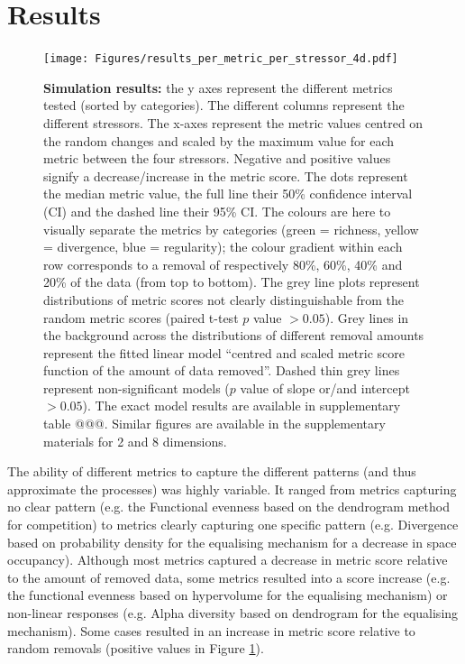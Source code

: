 \documentclass[12pt,letterpaper]{article}
\begin{document}
\section{Results}


\begin{figure}[!htbp]
\centering
   \texttt{[image: Figures/results\_per\_metric\_per\_stressor\_4d.pdf]}
\caption{\scriptsize{\textbf{Simulation results:} the y axes represent the different metrics tested (sorted by categories).
The different columns represent the different stressors. The x-axes represent the metric values centred on the random changes and scaled by the maximum value for each metric between the four stressors.
Negative and positive values signify a decrease/increase in the metric score.
The dots represent the median metric value, the full line their 50\% confidence interval (CI) and the dashed line their 95\% CI.
The colours are here to visually separate the metrics by categories (green = richness, yellow = divergence, blue = regularity); the colour gradient within each row corresponds to a removal of respectively 80\%, 60\%, 40\% and 20\% of the data (from top to bottom).
The grey line plots represent distributions of metric scores not clearly distinguishable from the random metric scores (paired t-test $p$ value $> 0.05$).
Grey lines in the background across the distributions of different removal amounts represent the fitted linear model ``centred and scaled metric score function of the amount of data removed''.
Dashed thin grey lines represent non-significant models ($p$ value of slope or/and intercept $> 0.05$).
The exact model results are available in supplementary table @@@.
Similar figures are available in the supplementary materials for 2 and 8 dimensions.}}
\label{Fig:simulation_results}
\end{figure}
\bigskip

The ability of different metrics to capture the different patterns (and thus approximate the processes) was highly variable.
It ranged from metrics capturing no clear pattern (e.g. the Functional evenness based on the dendrogram method for competition) to metrics clearly capturing one specific pattern (e.g. Divergence based on probability density for the equalising mechanism for a decrease in space occupancy).
Although most metrics captured a decrease in metric score relative to the amount of removed data, some metrics resulted into a score increase (e.g. the functional evenness based on hypervolume for the equalising mechanism) or non-linear responses (e.g. Alpha diversity based on dendrogram for the equalising mechanism).
Some cases resulted in an increase in metric score relative to random removals (positive values in Figure \ref{Fig:simulation_results}).
\end{document}
